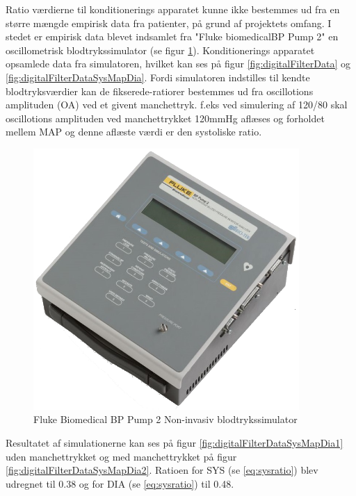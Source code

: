 \begin{minipage}[c]{0.5\textwidth}
	Ratio værdierne til konditionerings apparatet kunne ikke bestemmes ud fra en større mængde empirisk data fra patienter, på grund af projektets omfang. I stedet er empirisk data blevet indsamlet fra "Fluke biomedicalBP Pump 2" en oscillometrisk blodtrykssimulator (se figur \ref{fig:TheFlukeBiomedicalBPPump2L}). Konditionerings apparatet opsamlede data fra simulatoren, hvilket kan ses på figur \ref{fig:digitalFilterData} og \ref*{fig:digitalFilterDataSysMapDia}. Fordi simulatoren indstilles til kendte blodtryksværdier kan de fikserede-ratiorer bestemmes ud fra oscillotions amplituden (OA) ved et givent manchettryk. f.eks ved simulering af 120/80 skal oscillotions amplituden ved manchettrykket 120mmHg aflæses og forholdet mellem MAP og denne aflæste værdi er den systoliske ratio.
	
	
\end{minipage}
\begin{minipage}[c]{0.5\textwidth}
	\begin{figure}[H]
		\centering
		\includegraphics[trim={0 0 0 0},clip, width=0.9\textwidth]{billeder/TheFlukeBiomedicalBPPump2L.png}	
		\parbox{7cm}{\caption{Fluke Biomedical BP Pump 2 Non-invasiv blodtrykssimulator}\label{fig:TheFlukeBiomedicalBPPump2L}}
	\end{figure}
\end{minipage}

Resultatet af simulationerne kan ses på figur \ref{fig:digitalFilterDataSysMapDia1} uden manchettrykket og med manchettrykket på figur \ref{fig:digitalFilterDataSysMapDia2}. Ratioen for SYS (se \ref{eq:sysratio}) blev udregnet til 0.38 og for DIA (se \ref{eq:sysratio}) til 0.48. 

